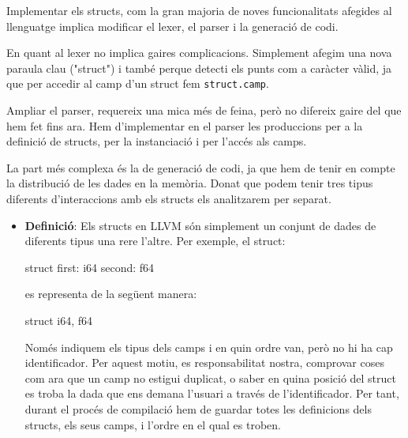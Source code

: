 ﻿\documentclass{article}
\begin{document}
\begin{enumerate}
        Implementar els structs, com la gran majoria de noves funcionalitats
        afegides al llenguatge implica modificar el lexer, el parser i la 
        generació de codi. 

        En quant al lexer no implica gaires complicacions. 
        Simplement afegim una nova paraula clau ("struct") i també perque detecti
        els punts com a caràcter vàlid, ja que per accedir al camp d'un struct
        fem \texttt{struct.camp}.

        Ampliar el parser, requereix una mica més de feina, però no difereix 
        gaire del que hem fet fins ara. Hem d'implementar en el parser les 
        produccions per a la definició de structs, per la instanciació i 
        per l'accés als camps.

       La part més complexa és la de generació de codi, ja que hem de tenir en
       compte la distribució de les dades en la memòria. Donat que podem tenir
       tres tipus diferents d'interaccions amb els structs els analitzarem per 
       separat.

       \begin{itemize}
        \item \textbf{Definició}: Els structs en LLVM són simplement un conjunt
            de dades de diferents tipus una rere l'altre. Per exemple, el struct:

            \begin{code}
                struct {
                    first: i64
                    second: f64
                }
            \end{code}

            es representa de la següent manera:

            \begin{code}
                struct { i64, f64 }
            \end{code}

            Només indiquem els tipus dels camps i en quin ordre van, però no hi
            ha cap identificador. Per aquest motiu, es responsabilitat nostra,
            comprovar coses com ara que un camp no estigui duplicat, o saber en
            quina posició del struct es troba la dada que ens demana l'usuari a
            través de l'identificador. Per tant, durant el procés de compilació
            hem de guardar totes les definicions dels structs, els seus camps, i
            l'ordre en el qual es troben.
       \end{itemize}


\end{enumerate}
\end{document}
